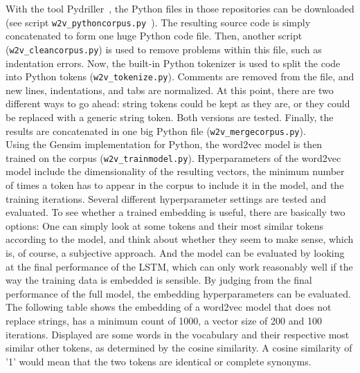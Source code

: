 \documentclass[
a4paper,
pagesize,
pdftex,
12pt,
ngerman,
fleqn,
final,
]{scrartcl}
\begin{document}
	\normalsize
	With the tool Pydriller~\cite{Spadini.2018}, the Python files in those repositories can be downloaded (see script \texttt{w2v\_pythoncorpus.py }). The resulting source code is simply concatenated to form one huge Python code file. Then, another script (\texttt{w2v\_cleancorpus.py}) is used to remove problems within this file, such as indentation errors. Now, the built-in Python tokenizer is used to split the code into Python tokens (\texttt{w2v\_tokenize.py}). Comments are removed from the file, and new lines, indentations, and tabs are normalized. At this point, there are two different ways to go ahead: string tokens could be kept as they are, or they could be replaced with a generic string token. Both versions are tested. Finally, the results are concatenated in one big Python file (\texttt{w2v\_mergecorpus.py}).\\
	Using the Gensim implementation for Python, the word2vec model is then trained on the corpus (\texttt{w2v\_trainmodel.py}). Hyperparameters of the word2vec model include the dimensionality of the resulting vectors, the minimum number of times a token has to appear in the corpus to include it in the model, and the training iterations. Several different hyperparameter settings are tested and evaluated. To see whether a trained embedding is useful, there are basically two options: One can simply look at some tokens and their most similar tokens according to the model, and think about whether they seem to make sense, which is, of course, a subjective approach. And the model can be evaluated by looking at the final performance of the LSTM, which can only work reasonably well if the way the training data is embedded is sensible. By judging from the final performance of the full model, the embedding hyperparameters can be evaluated.\\
	The following table shows the embedding of a word2vec model that does not replace strings, has a minimum count of 1000, a vector size of 200 and 100 iterations. Displayed are some words in the vocabulary and their respective most similar other tokens, as determined by the cosine similarity. A cosine similarity of '1' would mean that the two tokens are identical or complete synonyms.
	
\end{document}
